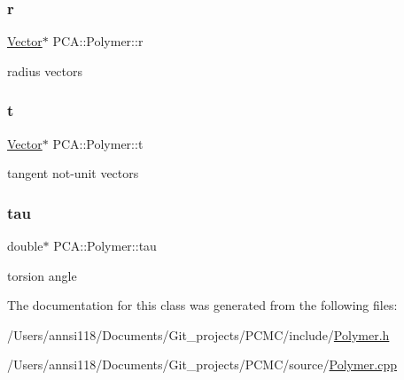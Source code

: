 \subsubsection{\texorpdfstring{r}{r}}
{\footnotesize\ttfamily \hyperlink{class_p_c_a_1_1_vector}{Vector}$\ast$ P\+C\+A\+::\+Polymer\+::r\hspace{0.3cm}{\ttfamily [protected]}}



radius vectors 

\hypertarget{class_p_c_a_1_1_polymer_a0fd79e19a8c09a9e4c72903924151b5e}{}\label{class_p_c_a_1_1_polymer_a0fd79e19a8c09a9e4c72903924151b5e} 
\subsubsection{\texorpdfstring{t}{t}}
{\footnotesize\ttfamily \hyperlink{class_p_c_a_1_1_vector}{Vector}$\ast$ P\+C\+A\+::\+Polymer\+::t\hspace{0.3cm}{\ttfamily [protected]}}



tangent not-\/unit vectors 

\hypertarget{class_p_c_a_1_1_polymer_ab3b07298bdbac01a7b20b2554d7b248f}{}\label{class_p_c_a_1_1_polymer_ab3b07298bdbac01a7b20b2554d7b248f} 
\subsubsection{\texorpdfstring{tau}{tau}}
{\footnotesize\ttfamily double$\ast$ P\+C\+A\+::\+Polymer\+::tau\hspace{0.3cm}{\ttfamily [protected]}}



torsion angle 



The documentation for this class was generated from the following files\+:\begin{DoxyCompactItemize}
\item 
/\+Users/annsi118/\+Documents/\+Git\+\_\+projects/\+P\+C\+M\+C/include/\hyperlink{_polymer_8h}{Polymer.\+h}\item 
/\+Users/annsi118/\+Documents/\+Git\+\_\+projects/\+P\+C\+M\+C/source/\hyperlink{_polymer_8cpp}{Polymer.\+cpp}\end{DoxyCompactItemize}
